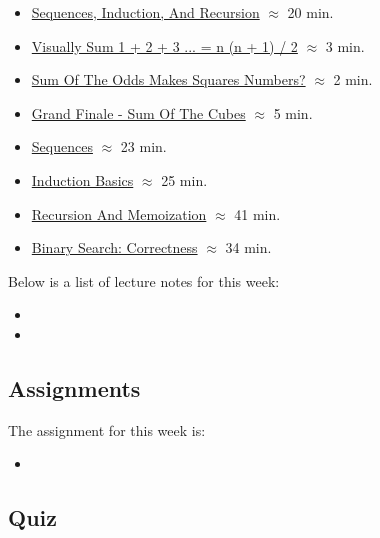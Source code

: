 \begin{itemize}
    \item \href{https://applied.cs.colorado.edu/mod/hvp/view.php?id=51758}{Sequences, Induction, And Recursion} $\approx$ 20 min.
    \item \href{https://www.youtube.com/watch?v=ktyTe2DGT2Y&t=97s}{Visually Sum 1 + 2 + 3 ... = n (n + 1) / 2} $\approx$ 3 min.
    \item \href{https://www.youtube.com/watch?v=3FemxVSgviw}{Sum Of The Odds Makes Squares Numbers?} $\approx$ 2 min.
    \item \href{https://www.youtube.com/watch?v=Knr5jmdb_Aw}{Grand Finale - Sum Of The Cubes} $\approx$ 5 min.
    \item \href{https://applied.cs.colorado.edu/mod/hvp/view.php?id=51762}{Sequences} $\approx$ 23 min.
    \item \href{https://applied.cs.colorado.edu/mod/hvp/view.php?id=51763}{Induction Basics} $\approx$ 25 min.
    \item \href{https://applied.cs.colorado.edu/mod/hvp/view.php?id=51765}{Recursion And Memoization} $\approx$ 41 min.
    \item \href{https://applied.cs.colorado.edu/mod/hvp/view.php?id=51769}{Binary Search: Correctness} $\approx$ 34 min.
\end{itemize}

\noindent Below is a list of lecture notes for this week:

\begin{itemize}
    \item {}
    \item {}
\end{itemize}

\subsection{Assignments}

The assignment for this week is:

\begin{itemize}
    \item {}
\end{itemize}

\subsection{Quiz}

